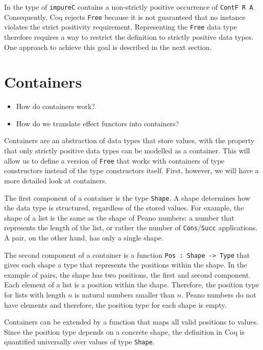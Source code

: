 \documentclass[a4paper, 11pt, fleqn, twoside]{scrreprt}
\newcommand{\hinl}[1]{\texttt{#1}}
\begin{document}
In the type of \texttt{impureC} contains a non-strictly positive occurrence of \texttt{ContF R A}.
Consequently, Coq rejects \texttt{Free} because it is not guaranteed that no instance violates the strict positivity requirement.
Representing the \texttt{Free} data type therefore requires a way to restrict the definition to strictly positive data types.
One approach to achieve this goal is described in the next section.

\section{Containers}

\begin{itemize}
\item How do containers work?
\item How do we translate effect functors into containers?
\end{itemize}

Containers are an abstraction of data types that store values, with the property that only strictly positive data types can be modelled as a container.
This will allow us to define a version of \texttt{Free} that works with containers of type constructors instead of the type constructors itself.
First, however, we will have a more detailed look at containers.

The first component of a container is the type \texttt{Shape}.
A shape determines how the data type is structured, regardless of the stored values.
For example, the  shape of a list is the same as the shape of Peano numbers: a number that  represents the length of the list, or rather the number of \hinl{Cons}/\hinl{Succ} applications.
A pair, on the other hand, has only a single shape.

The second component of a container is a function \texttt{Pos : Shape -> Type} that gives each shape a type that represents the positions within the shape.
In the example of pairs, the shape has two positions, the first and second component.
Each element of a list is a position within the shape.
Therefore, the position type for lists with length $n$ is natural numbers smaller than $n$.
Peano numbers do not have elements and therefore, the position type for each shape is empty.

Containers can be extended by a function that maps all valid positions to values.
Since the position type depends on a concrete shape, the definition in Coq is quantified universally over values of type \texttt{Shape}.
\end{document}
